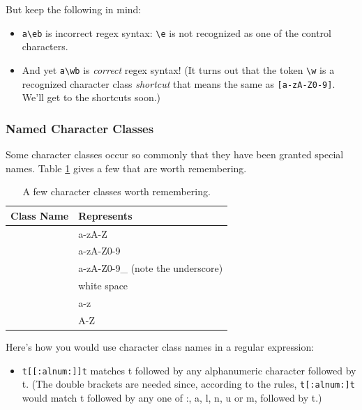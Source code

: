 \documentclass[]{book}
\providecommand{\tightlist}{%
  \setlength{\itemsep}{0pt}\setlength{\parskip}{0pt}}
\theoremstyle{definition}
\theoremstyle{definition}
\theoremstyle{definition}
\theoremstyle{remark}
\begin{document}
{But keep the following in mind:

\begin{itemize}
\tightlist
\item
  \texttt{a\textbackslash{}eb} is incorrect regex syntax:
  \texttt{\textbackslash{}e} is not recognized as one of the control
  characters.
\item
  And yet \texttt{a\textbackslash{}wb} is \emph{correct} regex syntax!
  (It turns out that the token \texttt{\textbackslash{}w} is a
  recognized character class \emph{shortcut} that means the same as
  \texttt{{[}a-zA-Z0-9{]}}. We'll get to the shortcuts soon.)
\end{itemize}

\subsubsection{Named Character Classes}\label{named-character-classes}

Some character classes occur so commonly that they have been granted
special names. Table \ref{tab:character-class-names} gives a few that
are worth remembering.

\begin{table}

\caption{\label{tab:character-class-names}A few character classes worth remembering.}
\centering
\begin{tabular}[t]{l|l}
\hline
Class Name & Represents\\
\hline
[:alpha:] & a-zA-Z\\
\hline
[:alnum:] & a-zA-Z0-9\\
\hline
[:word:] & a-zA-Z0-9\_ (note the underscore)\\
\hline
[:space:] & white space\\
\hline
[:lower:] & a-z\\
\hline
[:upper:] & A-Z\\
\hline
\end{tabular}
\end{table}

Here's how you would use character class names in a regular expression:

\begin{itemize}
\tightlist
\item
  \texttt{t{[}{[}:alnum:{]}{]}t} matches t followed by any alphanumeric
  character followed by t. (The double brackets are needed since,
  according to the rules, \texttt{t{[}:alnum:{]}t} would match t
  followed by any one of :, a, l, n, u or m, followed by t.)
\end{itemize}

}
\end{document}
